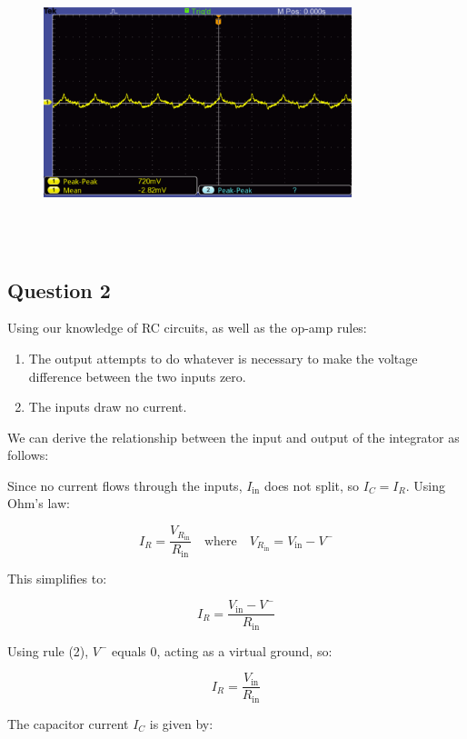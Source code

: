 \documentclass{article}
\begin{document}
\begin{figure}[H]
    \centering
    \includegraphics[width=0.8\textwidth]{img/Lab 8/1_5.png} %
    \caption{}
\end{figure}

\\ \\ 

\subsection*{Question 2}

Using our knowledge of RC circuits, as well as the op-amp rules:

\begin{enumerate}
    \item The output attempts to do whatever is necessary to make the voltage difference between the two inputs zero.
    \item The inputs draw no current.
\end{enumerate}

We can derive the relationship between the input and output of the integrator as follows:

Since no current flows through the inputs, \( I_{\text{in}} \) does not split, so \( I_C = I_R \). Using Ohm’s law:

\[
I_R = \frac{V_{R_{\text{in}}}}{R_{\text{in}}} \quad \text{where} \quad V_{R_{\text{in}}} = V_{\text{in}} - V^-
\]

This simplifies to:

\[
I_R = \frac{V_{\text{in}} - V^-}{R_{\text{in}}}
\]

Using rule (2), \( V^- \) equals 0, acting as a virtual ground, so:

\[
I_R = \frac{V_{\text{in}}}{R_{\text{in}}}
\]

The capacitor current \( I_C \) is given by:
\end{document}
